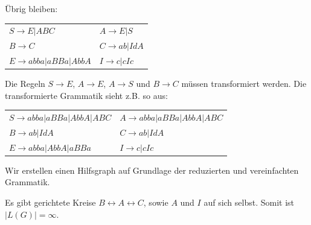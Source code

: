 \documentclass{article}
\begin{document}
Übrig bleiben:
\begin{center}
\begin{tabular}{ll}
$S \rightarrow E | ABC$            & $A \rightarrow E | S$ \\
$B \rightarrow C$                  & $C \rightarrow ab | IdA$ \\
$E \rightarrow abba | aBBa | AbbA$ & $I \rightarrow c | cIc$ \\
\end{tabular}
\end{center}
Die Regeln $S \rightarrow E$, $A \rightarrow E$, $A \rightarrow S$ und $B \rightarrow C$ müssen transformiert werden. Die transformierte Grammatik sieht z.B. so aus:
\begin{center}
\begin{tabular}{ll}
$S \rightarrow abba | aBBa | AbbA | ABC$ & $A \rightarrow abba | aBBa | AbbA | ABC$ \\
$B \rightarrow ab | IdA$                 & $C \rightarrow ab | IdA$ \\
$E \rightarrow abba | AbbA | aBBa$       & $I \rightarrow c | cIc$ \\
\end{tabular}
\end{center}

Wir erstellen einen Hilfsgraph auf Grundlage der reduzierten und vereinfachten Grammatik.
\begin{center}
\end{center}

Es gibt gerichtete Kreise $B \leftrightarrow A \leftrightarrow C$, sowie $A$ und $I$ auf sich selbst. Somit ist $|L(G)| = \infty$.
\end{document}
